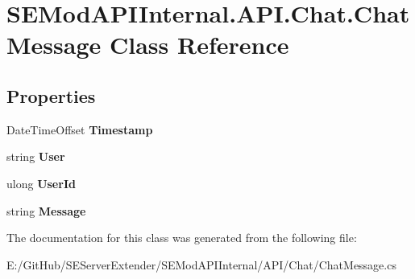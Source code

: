 \hypertarget{class_s_e_mod_a_p_i_internal_1_1_a_p_i_1_1_chat_1_1_chat_message}{}\section{S\+E\+Mod\+A\+P\+I\+Internal.\+A\+P\+I.\+Chat.\+Chat\+Message Class Reference}
\label{class_s_e_mod_a_p_i_internal_1_1_a_p_i_1_1_chat_1_1_chat_message}
\subsection*{Properties}
\begin{DoxyCompactItemize}
\item 
\hypertarget{class_s_e_mod_a_p_i_internal_1_1_a_p_i_1_1_chat_1_1_chat_message_ae25c676411d3c24e0778d38f23b2b32f}{}Date\+Time\+Offset {\bfseries Timestamp}\label{class_s_e_mod_a_p_i_internal_1_1_a_p_i_1_1_chat_1_1_chat_message_ae25c676411d3c24e0778d38f23b2b32f}

\item 
\hypertarget{class_s_e_mod_a_p_i_internal_1_1_a_p_i_1_1_chat_1_1_chat_message_a85946b134bfcc056ee56b4a364956371}{}string {\bfseries User}\label{class_s_e_mod_a_p_i_internal_1_1_a_p_i_1_1_chat_1_1_chat_message_a85946b134bfcc056ee56b4a364956371}

\item 
\hypertarget{class_s_e_mod_a_p_i_internal_1_1_a_p_i_1_1_chat_1_1_chat_message_a0384d90db558fcea866753096533d7cb}{}ulong {\bfseries User\+Id}\label{class_s_e_mod_a_p_i_internal_1_1_a_p_i_1_1_chat_1_1_chat_message_a0384d90db558fcea866753096533d7cb}

\item 
\hypertarget{class_s_e_mod_a_p_i_internal_1_1_a_p_i_1_1_chat_1_1_chat_message_acbb015ac297e30c8b75ed9d45370ba1e}{}string {\bfseries Message}\label{class_s_e_mod_a_p_i_internal_1_1_a_p_i_1_1_chat_1_1_chat_message_acbb015ac297e30c8b75ed9d45370ba1e}

\end{DoxyCompactItemize}


The documentation for this class was generated from the following file\+:\begin{DoxyCompactItemize}
\item 
E\+:/\+Git\+Hub/\+S\+E\+Server\+Extender/\+S\+E\+Mod\+A\+P\+I\+Internal/\+A\+P\+I/\+Chat/Chat\+Message.\+cs\end{DoxyCompactItemize}
